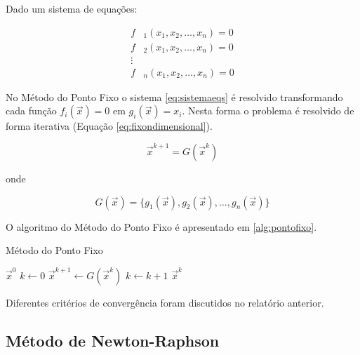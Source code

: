 \documentclass[final,5p]{elsarticle}
\numberwithin{equation}{section}
\begin{document}
        Dado um sistema de equações:

        \begin{align}
            f&_1(x_1,x_2,\ldots,x_n) = 0 \nonumber \\
            f&_2(x_1,x_2,\ldots,x_n) = 0 \nonumber \\
            \vdots &  \nonumber \\
            f&_n(x_1,x_2,\ldots,x_n) = 0 \label{eq:sistemaeqs}
        \end{align}

        No Método do Ponto Fixo o sistema \ref{eq:sistemaeqs} é resolvido transformando cada função $f_i(\vec{x}) = 0$ em $g_i(\vec{x}) = x_i$. Nesta forma o problema é resolvido de forma iterativa (Equação \ref{eq:fixondimensional})\cite{burden2016analise}.

        \begin{equation}
            \vec{x}^{k+1} = G(\vec{x}^k) \label{eq:fixondimensional}
        \end{equation}

        \noindent onde

        \begin{equation}
            G(\vec{x}) = \{g_1(\vec{x}), g_2(\vec{x}), \ldots, g_n(\vec{x})\}
        \end{equation}

        O algoritmo do Método do Ponto Fixo é apresentado em \ref{alg:pontofixo}.

        \begin{algorithm}
            \caption{Método do Ponto Fixo}\label{alg:pontofixo}
            \begin{algorithmic}
                \Require $\vec{x}^0$
                \State $k \gets 0$
                \Repeat
                    \State $\vec{x}^{k+1} \gets G(\vec{x}^{k}) $
                    \State $k \gets k+1$
                \State \Return $\vec{x}^{k}$
            \end{algorithmic}
        \end{algorithm}

        Diferentes critérios de convergência foram discutidos no relatório anterior\cite{relatoriojacobi}.

    \subsection{Método de Newton-Raphson}
\end{document}
